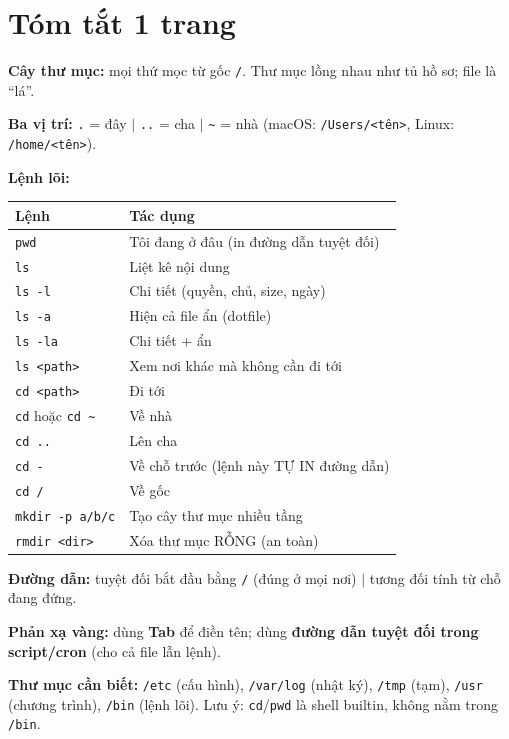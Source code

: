 \documentclass[12pt,a4paper]{article}
\newcommand{\hm}{\textasciitilde{}}
\begin{document}
\section{Tóm tắt 1 trang}

\begin{notebox}[title={Tóm tắt}]
\textbf{Cây thư mục:} mọi thứ mọc từ gốc \texttt{/}. Thư mục lồng nhau như tủ hồ sơ; file là ``lá''.

\vspace{0.4em}
\textbf{Ba vị trí:} \texttt{.} = đây $\mid$ \texttt{..} = cha $\mid$ \texttt{\hm} = nhà (macOS: \texttt{/Users/<tên>}, Linux: \texttt{/home/<tên>}).

\vspace{0.4em}
\textbf{Lệnh lõi:}
\renewcommand{\arraystretch}{1.3}
\begin{center}
\begin{tabular}{>{\raggedright\arraybackslash}p{4cm} >{\raggedright\arraybackslash}p{8cm}}
\rowcolor{checkback}
\textbf{Lệnh} & \textbf{Tác dụng} \\
\hline
\texttt{pwd} & Tôi đang ở đâu (in đường dẫn tuyệt đối) \\
\texttt{ls} & Liệt kê nội dung \\
\texttt{ls -l} & Chi tiết (quyền, chủ, size, ngày) \\
\texttt{ls -a} & Hiện cả file ẩn (dotfile) \\
\texttt{ls -la} & Chi tiết + ẩn \\
\texttt{ls <path>} & Xem nơi khác mà không cần đi tới \\
\texttt{cd <path>} & Đi tới \\
\texttt{cd} hoặc \texttt{cd \hm} & Về nhà \\
\texttt{cd ..} & Lên cha \\
\texttt{cd -} & Về chỗ trước (lệnh này TỰ IN đường dẫn) \\
\texttt{cd /} & Về gốc \\
\texttt{mkdir -p a/b/c} & Tạo cây thư mục nhiều tầng \\
\texttt{rmdir <dir>} & Xóa thư mục RỖNG (an toàn) \\
\end{tabular}
\end{center}
\renewcommand{\arraystretch}{1}

\vspace{0.4em}
\textbf{Đường dẫn:} tuyệt đối bắt đầu bằng \texttt{/} (đúng ở mọi nơi) $\mid$ tương đối tính từ chỗ đang đứng.

\vspace{0.4em}
\textbf{Phản xạ vàng:} dùng \textbf{Tab} để điền tên; dùng \textbf{đường dẫn tuyệt đối trong script/cron} (cho cả file lẫn lệnh).

\vspace{0.4em}
\textbf{Thư mục cần biết:} \texttt{/etc} (cấu hình), \texttt{/var/log} (nhật ký), \texttt{/tmp} (tạm), \texttt{/usr} (chương trình), \texttt{/bin} (lệnh lõi). Lưu ý: \texttt{cd}/\texttt{pwd} là shell builtin, không nằm trong \texttt{/bin}.
\end{notebox}
\end{document}
